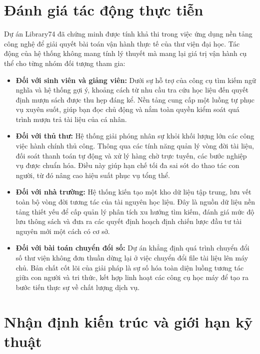 \section{Đánh giá tác động thực tiễn}

Dự án Library74 đã chứng minh được tính khả thi trong việc ứng dụng nền tảng công nghệ để giải quyết bài toán vận hành thực tế của thư viện đại học. Tác động của hệ thống không mang tính lý thuyết mà mang lại giá trị vận hành cụ thể cho từng nhóm đối tượng tham gia:

\begin{itemize}
    \item \textbf{Đối với sinh viên và giảng viên:} Dưới sự hỗ trợ của công cụ tìm kiếm ngữ nghĩa và hệ thống gợi ý, khoảng cách từ nhu cầu tra cứu học liệu đến quyết định mượn sách được thu hẹp đáng kể. Nền tảng cung cấp một luồng tự phục vụ xuyên suốt, giúp bạn đọc chủ động và nắm toàn quyền kiểm soát quá trình mượn trả tài liệu của cá nhân.

    \item \textbf{Đối với thủ thư:} Hệ thống giải phóng nhân sự khỏi khối lượng lớn các công việc hành chính thủ công. Thông qua các tính năng quản lý vòng đời tài liệu, đối soát thanh toán tự động và xử lý hàng chờ trực tuyến, các bước nghiệp vụ được chuẩn hóa. Điều này giúp hạn chế tối đa sai sót do thao tác con người, từ đó nâng cao hiệu suất phục vụ tổng thể.

    \item \textbf{Đối với nhà trường:} Hệ thống kiến tạo một kho dữ liệu tập trung, lưu vết toàn bộ vòng đời tương tác của tài nguyên học liệu. Đây là nguồn dữ liệu nền tảng thiết yếu để cấp quản lý phân tích xu hướng tìm kiếm, đánh giá mức độ lưu thông sách và đưa ra các quyết định hoạch định chiến lược đầu tư tài nguyên mới một cách có cơ sở.

    \item \textbf{Đối với bài toán chuyển đổi số:} Dự án khẳng định quá trình chuyển đổi số thư viện không đơn thuần dừng lại ở việc chuyển đổi file tài liệu lên máy chủ. Bản chất cốt lõi của giải pháp là sự số hóa toàn diện luồng tương tác giữa con người và tri thức, kết hợp linh hoạt các công cụ học máy để tạo ra bước tiến thực sự về chất lượng dịch vụ.
\end{itemize}

\section{Nhận định kiến trúc và giới hạn kỹ thuật}

